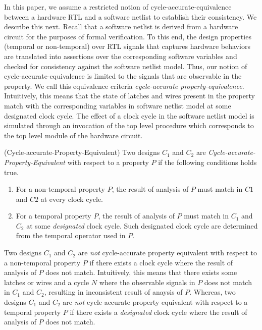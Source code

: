 In this paper, we assume a restricted notion of cycle-accurate-equivalence
between a hardware RTL and a software netlist to establish their consistency.  
We describe this next. 
%
Recall that a software netlist is derived from a hardware circuit for the
purposes of formal verification.  To this end, the design properties 
(temporal or non-temporal) over RTL signals that captures hardware behaviors 
are translated into assertions over the corresponding software variables and 
checked for consistency against the software
netlist model.  Thus, our notion of cycle-accurate-equivalence is 
limited to the signals that are observable in the property.  
We call this equivalence criteria \emph{cycle-accurate property-equivalence}.  
Intuitively, this means that the state of latches and wires 
present in the property match with the corresponding variables in software 
netlist model at some designated clock cycle.  The effect of a clock cycle 
in the software netlist model is simulated through an invocation of the top 
level procedure which corresponds to the top level module of the hardware circuit. 
%
\begin{definition} (Cycle-accurate-Property-Equivalent) 
  Two designs $C_1$ and $C_2$ are \emph{Cycle-accurate-Property-Equivalent} with
  respect to a property $P$ if the following conditions holds true. 
  \begin{enumerate}
    \item For a non-temporal property $P$, the result of analysis of $P$ must
      match in $C1$ and $C2$ at every clock cycle.  
   \item For a temporal property $P$, the result of analysis of $P$ must 
     match in $C_1$ and $C_2$ at some \emph{designated} clock cycle.  Such
      designated clock cycle are determined from the temporal operator used in $P$. 
  \end{enumerate}
\end{definition}
%
Two designs $C_1$ and $C_2$ are \emph{not} cycle-accurate property equivalent 
with respect to a non-temporal property $P$ if there exists a clock cycle where 
the result of analysis of $P$ does not match.  Intuitively, this means that 
there exists some latches or wires and a cycle $N$ where the observable signals in $P$ 
does not match in $C_1$ and $C_2$, resulting in inconsistent result of anaysis of $P$. 
%
Whereas, two designs $C_1$ and $C_2$ are \emph{not} cycle-accurate property equivalent 
with respect to a temporal property $P$ if there exists a \emph{designated} clock cycle 
where the result of analysis of $P$ does not match. 



